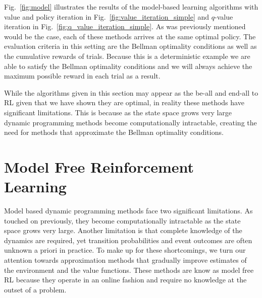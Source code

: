 \documentclass{article}
\begin{document}
Fig.~\ref{fig:model} illustrates the results of the model-based learning algorithms with value and policy iteration in Fig.~\ref{fig:value_iteration_simple} and $q$-value iteration in Fig.~\ref{fig:q_value_iteration_simple}. As was previously mentioned would be the case, each of these methods arrives at the same optimal policy. The evaluation criteria in this setting are the Bellman optimality conditions as well as the cumulative rewards of trials. Because this is a deterministic example we are able to satisfy the Bellman optimality conditions and we will always achieve the maximum possible reward in each trial as a result.

While the algorithms given in this section may appear as the be-all and end-all to RL given that we have shown they are optimal, in reality these methods have significant limitations. This is because as the state space grows very large dynamic programming methods become computationally intractable, creating the need for methods that approximate the Bellman optimality conditions. 

\section{Model Free Reinforcement Learning}\label{sec:model_free}
Model based dynamic programming methods face two significant limitations. As touched on previously, they become computationally intractable as the state space grows very large. Another limitation is that complete knowledge of the dynamics are required, yet transition probabilities and event outcomes are often unknown a priori in practice. To make up for these shortcomings, we turn our attention towards approximation methods that gradually improve estimates of the environment and the value functions. These methods are know as model free RL because they operate in an online fashion and require no knowledge at the outset of a problem.
\end{document}
